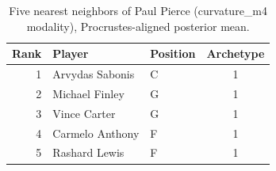 \begin{table}[htbp]
  \centering\small
  \begin{tabular}{rllc}
    \toprule
    Rank & Player & Position & Archetype \\
    \midrule
    1 & Arvydas Sabonis & C & 1 \\
    2 & Michael Finley & G & 1 \\
    3 & Vince Carter & G & 1 \\
    4 & Carmelo Anthony & F & 1 \\
    5 & Rashard Lewis & F & 1 \\
    \bottomrule
  \end{tabular}
  \caption{Five nearest neighbors of Paul Pierce (curvature_m4 modality), Procrustes-aligned posterior mean.}
  \label{tab:Paul_Pierce_neighbors_curvature_m4}
\end{table}

